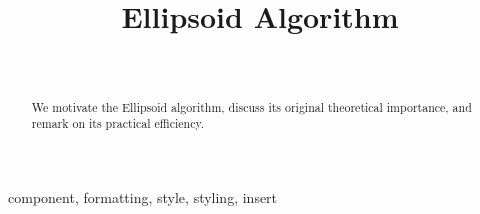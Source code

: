 \documentclass[conference]{IEEEtran}
\begin{document}
\title{Ellipsoid Algorithm }

\author{
 \\
}

\newcommand{\PTIME}{\texttt{PTIME}}
\maketitle

\begin{abstract}
We motivate the Ellipsoid algorithm, discuss its original theoretical
importance, and remark on its practical efficiency.
\end{abstract}

\begin{IEEEkeywords}
component, formatting, style, styling, insert
\end{IEEEkeywords}
\end{document}
